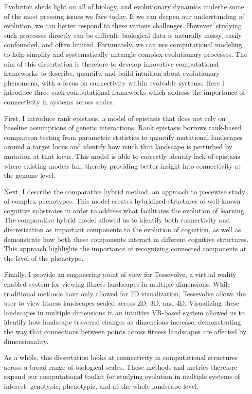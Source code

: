 Evolution sheds light on all of biology, and evolutionary dynamics underlie some of the most pressing issues we face today.  
If we can deepen our understanding of evolution, we can better respond to these various challenges.
However, studying such processes directly can be difficult; biological data is naturally messy, easily confounded, and often limited. 
Fortunately, we can use computational modeling to help simplify and systematically untangle complex evolutionary processes.
The aim of this dissertation is therefore to develop innovative computational frameworks to describe, quantify, and build intuition about evolutionary phenomena, with a focus on connectivity within evolvable systems. 
Here I introduce three such computational frameworks which address the importance of connectivity in systems across scales.

First, I introduce rank epistasis, a model of epistasis that does not rely on baseline assumptions of genetic interactions. Rank epistasis borrows rank-based comparison testing from parametric statistics to quantify mutational landscapes around a target locus and identify how much that landscape is perturbed by mutation at that locus. This model is able to correctly identify lack of epistasis where existing models fail, thereby providing better insight into connectivity at the genome level.

Next, I describe the comparative hybrid method, an approach to piecewise study of complex phenotypes. This model creates hybridized structures of well-known cognitive substrates in order to address what facilitates the evolution of learning. The comparative hybrid model allowed us to identify both connectivity and discretization as important components to the evolution of cognition, as well as demonstrate how both these components interact in different cognitive structures. This approach highlights the importance of recognizing connected components at the level of the phenotype.

Finally, I provide an engineering point of view for Tessevolve, a virtual reality enabled system for viewing fitness landscapes in multiple dimensions. While traditional methods have only allowed for 2D visualization, Tessevolve allows the user to view fitness landscapes scaled across 2D, 3D, and 4D. Visualizing these landscapes in multiple dimensions in an intuitive VR-based system allowed us to identify how landscape traversal changes as dimensions increase, demonstrating the way that connections between points across fitness landscapes are affected by dimensionality. 

As a whole, this dissertation looks at connectivity in computational structures across a broad range of biological scales. These methods and metrics therefore expand our computational toolkit for studying evolution in multiple systems of interest: genotypic, phenotypic, and at the whole landscape level. 